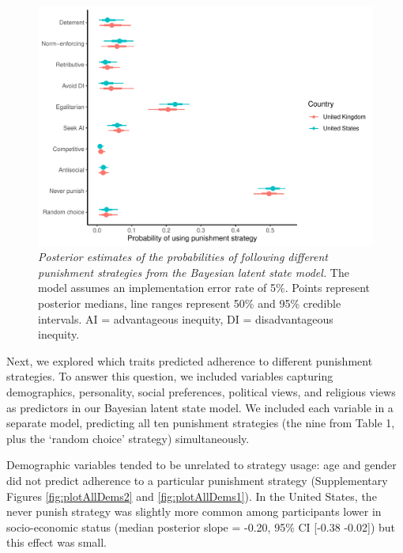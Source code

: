 \documentclass[
  man, donotrepeattitle,floatsintext]{apa6}
\begin{document}
\begin{figure}
\centering
\includegraphics{manuscript_files/figure-latex/plotModel1b-1.pdf}
\caption{\label{fig:plotModel1b}\emph{Posterior estimates of the probabilities of following
different punishment strategies from the Bayesian latent state model.} The model
assumes an implementation error rate of 5\%. Points represent posterior medians,
line ranges represent 50\% and 95\% credible intervals. AI = advantageous
inequity, DI = disadvantageous inequity.}
\end{figure}

Next, we explored which traits predicted adherence to different punishment
strategies. To answer this question, we included variables capturing
demographics, personality, social preferences, political views, and religious
views as predictors in our Bayesian latent state model. We included each
variable in a separate model, predicting all ten punishment strategies
(the nine from Table 1, plus the `random choice' strategy) simultaneously.

Demographic variables tended to be unrelated to strategy usage: age and gender
did not predict adherence to a particular punishment strategy (Supplementary
Figures \ref{fig:plotAllDems2} and \ref{fig:plotAllDems1}). In the United
States, the never punish strategy was slightly more common among participants
lower in socio-economic status (median posterior slope =
-0.20, 95\% CI {[}-0.38
-0.02{]}) but this effect was small.
\end{document}
